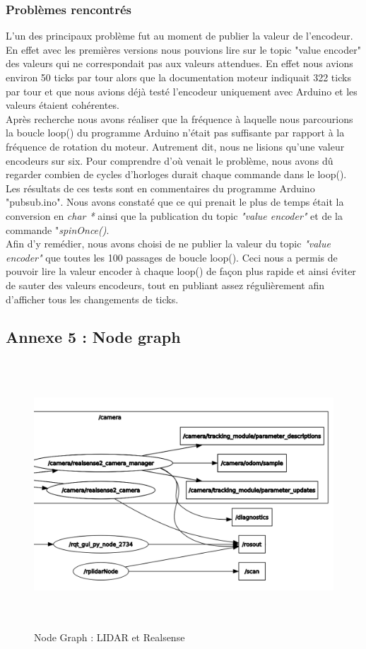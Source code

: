 \documentclass[french]{rapportENSTAB}
\begin{document}
\subsubsection{Problèmes rencontrés}

L'un des principaux problème fut au moment de publier la valeur de l'encodeur. En effet avec les premières versions nous pouvions lire sur le topic "value encoder" des valeurs qui ne correspondait pas aux valeurs attendues. En effet nous avions environ 50 ticks par tour alors que la documentation moteur indiquait 322 ticks par tour et que nous avions déjà testé l'encodeur uniquement avec Arduino et les valeurs étaient cohérentes.\\ 

Après recherche nous avons réaliser que la fréquence à laquelle nous parcourions la boucle loop() du programme Arduino n'était pas suffisante par rapport à la fréquence de rotation du moteur. Autrement dit, nous ne lisions qu'une valeur encodeurs sur six. Pour comprendre d'où venait le problème, nous avons dû regarder combien de cycles d'horloges durait chaque commande dans le loop(). Les résultats de ces tests sont en commentaires du programme Arduino "pubsub.ino". Nous avons constaté que ce qui prenait le plus de temps était la conversion en \textit{char *} ainsi que la publication du topic \textit{"value encoder"} et de la commande "\textit{spinOnce()}.\\

Afin d'y remédier, nous avons choisi de ne publier la valeur du topic \textit{"value encoder"} que toutes les 100 passages de boucle loop(). Ceci nous a permis de pouvoir lire la valeur encoder à chaque loop() de façon plus rapide et ainsi éviter de sauter des valeurs encodeurs, tout en publiant assez régulièrement afin d'afficher tous les changements de ticks.

\subsection{Annexe 5 : Node graph } \label{annexe5}


\begin{figure}[H]
    \centering
    \includegraphics[width = 15cm,height = 10cm]{images/robot/node_graph.png}
    \caption{Node Graph : LIDAR et Realsense}
    \label{fig:archi elec}
\end{figure}
\end{document}
